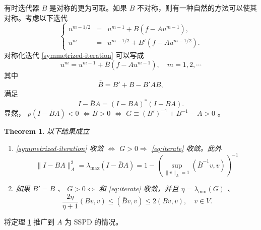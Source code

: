 \documentclass[12pt]{acta_2011xz}
\newtheorem{theorem}{Theorem}[section]
\begin{document}
有时迭代器    $B$    是对称的更为可取。如果
   $B$    不对称，则有一种自然的方法可以使其对称。考虑以下迭代
   \begin{equation}
\label{symmetrized-iteration}  
\left \{ 
\begin{array}{lcl}
u^{m-1/2} &=& u^{m-1}+ B(f-Au^{m-1}), \\ 
u^{m} &=& u^{m-1/2}+ B'(f-Au^{m-1/2}).
\end{array}
\right.
\end{equation}    对称化迭代    \eqref{symmetrized-iteration}    可以写成
   \begin{equation}
\label{sym-iterate}
u^{m}= u^{m-1}+\bar B(f-Au^{m-1}), \quad m=1,2,\cdots 
\end{equation}    其中
   \begin{equation}\label{symm}
\bar B=B'+B-B'AB,
\end{equation}    满足
   \begin{equation}\label{symm1}
I-\bar BA=(I-BA)^*(I-BA).
\end{equation}    显然，    $\rho(I-\bar BA)<0$       $\Longleftrightarrow \bar B>0$    
   $\Longleftrightarrow$       $G\equiv (B')^{-1}+B^{-1}-A>0$    。  

   \begin{theorem}   \label{thm:iterate-converge}    以下结果成立
   \begin{enumerate}

   \item      \eqref{symmetrized-iteration}    收敛          $\Longleftrightarrow$          
         $G>0 \Longrightarrow $             \eqref{eq:iterate}    收敛。此外
   \begin{equation}
  \label{errA}
\|I-BA\|_A^2
=\lambda_{\max}(I-\bar BA)
=1-\left(\sup_{\|v\|_A=1}(\bar B^{-1}v,v)\right)^{-1}
\end{equation}      \item   如果          $B'=B$          、          $G>0 \Longleftrightarrow$          和    \eqref{eq:iterate}    收敛，并且          $\eta=\lambda_{\min}(G)$          、 
   \begin{equation}
  \label{BB}
  \frac{2\eta}{\eta+1}(Bv,v)\le (\bar Bv,v)\le
  2(Bv,v), \quad v\in V. 
\end{equation}     \end{enumerate}     \end{theorem}     

   \exercise    将定理    \ref{thm:iterate-converge}    推广到    $A$    为 SSPD 的情况。  
\end{document}
